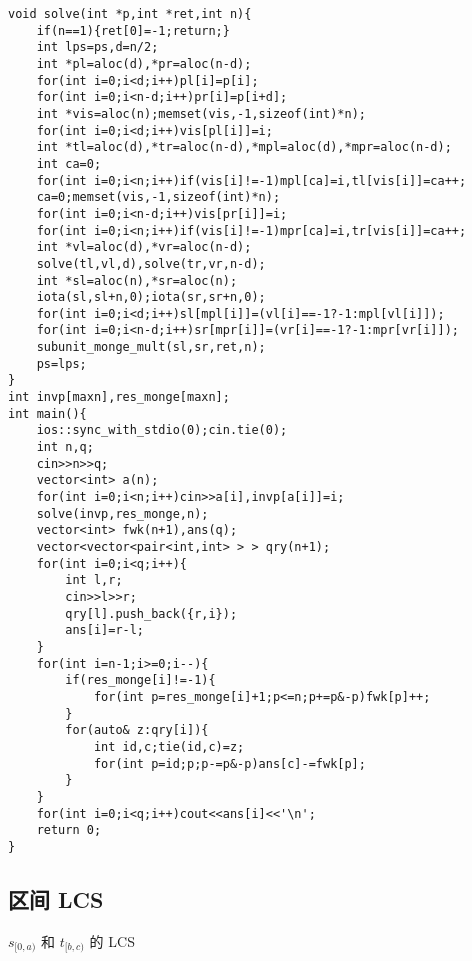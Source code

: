 \documentclass[12pt]{ctexart}
\begin{document}
\begin{lstlisting}
void solve(int *p,int *ret,int n){
    if(n==1){ret[0]=-1;return;}
    int lps=ps,d=n/2;
    int *pl=aloc(d),*pr=aloc(n-d);
    for(int i=0;i<d;i++)pl[i]=p[i];
    for(int i=0;i<n-d;i++)pr[i]=p[i+d];
    int *vis=aloc(n);memset(vis,-1,sizeof(int)*n);
    for(int i=0;i<d;i++)vis[pl[i]]=i;
    int *tl=aloc(d),*tr=aloc(n-d),*mpl=aloc(d),*mpr=aloc(n-d);
    int ca=0;
    for(int i=0;i<n;i++)if(vis[i]!=-1)mpl[ca]=i,tl[vis[i]]=ca++;
    ca=0;memset(vis,-1,sizeof(int)*n);
    for(int i=0;i<n-d;i++)vis[pr[i]]=i;
    for(int i=0;i<n;i++)if(vis[i]!=-1)mpr[ca]=i,tr[vis[i]]=ca++;
    int *vl=aloc(d),*vr=aloc(n-d);
    solve(tl,vl,d),solve(tr,vr,n-d);
    int *sl=aloc(n),*sr=aloc(n);
    iota(sl,sl+n,0);iota(sr,sr+n,0);
    for(int i=0;i<d;i++)sl[mpl[i]]=(vl[i]==-1?-1:mpl[vl[i]]);
    for(int i=0;i<n-d;i++)sr[mpr[i]]=(vr[i]==-1?-1:mpr[vr[i]]);
    subunit_monge_mult(sl,sr,ret,n);
    ps=lps;
}
int invp[maxn],res_monge[maxn];
int main(){
    ios::sync_with_stdio(0);cin.tie(0);
    int n,q;
    cin>>n>>q;
    vector<int> a(n);
    for(int i=0;i<n;i++)cin>>a[i],invp[a[i]]=i;
    solve(invp,res_monge,n);
    vector<int> fwk(n+1),ans(q);
    vector<vector<pair<int,int> > > qry(n+1);
    for(int i=0;i<q;i++){
        int l,r;
        cin>>l>>r;
        qry[l].push_back({r,i});
        ans[i]=r-l;
    }
    for(int i=n-1;i>=0;i--){
        if(res_monge[i]!=-1){
            for(int p=res_monge[i]+1;p<=n;p+=p&-p)fwk[p]++;
        }
        for(auto& z:qry[i]){
            int id,c;tie(id,c)=z;
            for(int p=id;p;p-=p&-p)ans[c]-=fwk[p];
        }
    }
    for(int i=0;i<q;i++)cout<<ans[i]<<'\n';
    return 0;
}
\end{lstlisting}

\subsection{区间 LCS}

$s_{[0,a)}$ 和 $t_{[b,c)}$ 的 LCS
\end{document}
